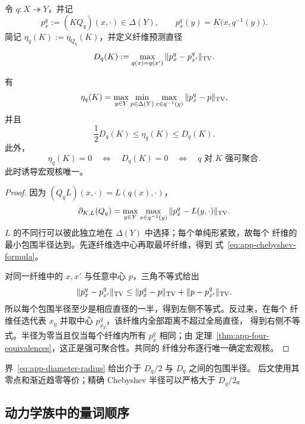 令 $q:X\twoheadrightarrow Y$，并记
\[
  p_x^q:=(KQ_q)(x,\cdot)\in\Delta(Y),
  \qquad
  p_x^q(y)=K\bigl(x,q^{-1}(y)\bigr).
\]
简记 $\eta_q(K):=\eta_{Q_q}(K)$，并定义纤维预测直径
\begin{equation}
  D_q(K):=\max_{q(x)=q(x')}
  \|p_x^q-p_{x'}^q\|_{\operatorname{TV}}.
  \label{eq:app-fiber-diameter}
\end{equation}

\begin{theorem}[纤维 Chebyshev 中心]
\label{thm:app-chebyshev-center}
有
\begin{equation}
 \eta_q(K)
 =\max_{y\in Y}
   \min_{p\in\Delta(Y)}
   \max_{x\in q^{-1}(y)}\|p_x^q-p\|_{\operatorname{TV}},
 \label{eq:app-chebyshev-formula}
\end{equation}
并且
\begin{equation}
  \boxed{\frac12D_q(K)\le\eta_q(K)\le D_q(K).}
  \label{eq:app-diameter-radius}
\end{equation}
此外，
\begin{equation}
 \eta_q(K)=0
 \quad\Longleftrightarrow\quad
 D_q(K)=0
 \quad\Longleftrightarrow\quad
 q\text{ 对 }K\text{ 强可聚合}.
 \label{eq:app-zero-approx-exact}
\end{equation}
此时诱导宏观核唯一。
\end{theorem}

\begin{proof}
因为 $(Q_qL)(x,\cdot)=L(q(x),\cdot)$，
\[
 \partial_{K,L}(Q_q)
 =\max_{y\in Y}\max_{x\in q^{-1}(y)}
   \|p_x^q-L(y,\cdot)\|_{\operatorname{TV}}.
\]
$L$ 的不同行可以彼此独立地在 $\Delta(Y)$ 中选择；每个单纯形紧致，故每个
纤维的最小包围半径达到。先逐纤维选中心再取最坏纤维，得到
式~\eqref{eq:app-chebyshev-formula}。

对同一纤维中的 $x,x'$ 与任意中心 $p$，三角不等式给出
\[
 \|p_x^q-p_{x'}^q\|_{\operatorname{TV}}
 \le\|p_x^q-p\|_{\operatorname{TV}}+\|p-p_{x'}^q\|_{\operatorname{TV}}.
\]
所以每个包围半径至少是相应直径的一半，得到左侧不等式。反过来，在每个
纤维任选代表 $x_y$ 并取中心 $p_{x_y}^q$，该纤维内全部距离不超过全局直径，
得到右侧不等式。半径为零当且仅当每个纤维内所有 $p_x^q$ 相同；由
定理~\ref{thm:app-four-equivalences}，这正是强可聚合性。共同的
纤维分布逐行唯一确定宏观核。
\end{proof}

界~\eqref{eq:app-diameter-radius} 给出介于 $D_q/2$ 与 $D_q$ 之间的包围半径。
后文使用其零点和渐近趋零等价；精确 Chebyshev 半径可以严格大于 $D_q/2$。

\subsection{动力学族中的量词顺序}

